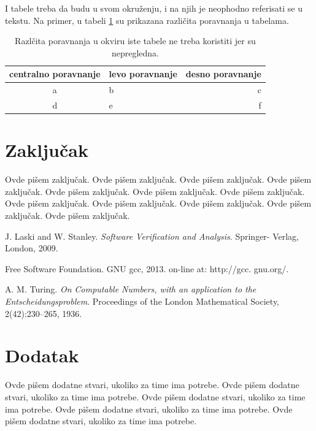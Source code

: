 \documentclass[a4paper]{article}
\begin{document}
\begin{primer} I tabele treba da budu u svom okruženju, i na njih je neophodno referisati se u tekstu. Na primer, u tabeli \ref{tab:tabela1} su prikazana različita poravnanja u tabelama.

\begin{table}[h!]
\begin{center}
\caption{Razlčita poravnanja u okviru iste tabele ne treba koristiti jer su nepregledna.}
\begin{tabular}{|c|l|r|} \hline
centralno poravnanje& levo poravnanje& desno poravnanje\\ \hline
a &b&c\\ \hline
d &e&f\\ \hline
\end{tabular}
\label{tab:tabela1}
\end{center}
\end{table}

\end{primer}






\section{Zaključak}
\label{sec:zakljucak}

Ovde pišem zaključak. 
Ovde pišem zaključak. 
Ovde pišem zaključak. 
Ovde pišem zaključak. 
Ovde pišem zaključak. 
Ovde pišem zaključak. 
Ovde pišem zaključak. 
Ovde pišem zaključak. 
Ovde pišem zaključak. 
Ovde pišem zaključak. 
Ovde pišem zaključak. 
Ovde pišem zaključak. 


\appendix

\begin{thebibliography}{9}

 J. Laski and W. Stanley. \emph{Software Verification and Analysis}. Springer- Verlag, London, 2009.

 Free Software Foundation. GNU gcc, 2013. on-line at: http://gcc. gnu.org/.

 A. M. Turing. \emph{On Computable Numbers, with an application to the Entscheidungsproblem}. Proceedings of the London Mathematical Society, 2(42):230–265, 1936.


\end{thebibliography}


\appendix
\section{Dodatak}
Ovde pišem dodatne stvari, ukoliko za time ima potrebe.
Ovde pišem dodatne stvari, ukoliko za time ima potrebe.
Ovde pišem dodatne stvari, ukoliko za time ima potrebe.
Ovde pišem dodatne stvari, ukoliko za time ima potrebe.
Ovde pišem dodatne stvari, ukoliko za time ima potrebe.
\end{document}
